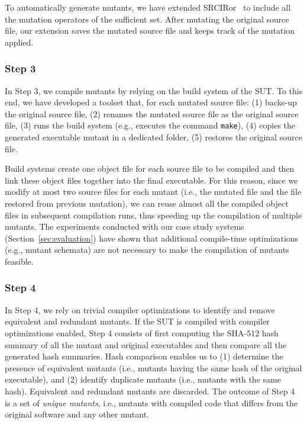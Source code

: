 

To automatically generate mutants, we have extended SRCIRor~\cite{hariri2018srciror} to include all the mutation operators of the sufficient set. After mutating the original source file, our extension saves the mutated source file and keeps track of the mutation applied. 

\subsubsection{Step 3}

In Step 3, we compile mutants by relying on the build system of the SUT. To this end, we have developed a toolset that, for each mutated source file: (1) backs-up the original source file, (2) renames the mutated source file as the original source file, (3) runs the build system (e.g., executes the command \texttt{make}), (4) copies the generated executable mutant in a dedicated folder, (5) restores the original source file. 

Build systems create one object file for each source file to be compiled and then link these object files together into the final executable. For this reason, since we modify at most two source files for each mutant (i.e., the mutated file and the file restored from previous mutation), we can reuse almost all the compiled object files in subsequent compilation runs, thus speeding up the compilation of multiple mutants. The experiments conducted with our case study systems (Section~\ref{sec:evaluation}) have shown that additional compile-time optimizations (e.g., mutant schemata) are not necessary to make the compilation of mutants feasible.

\subsubsection{Step 4}

In Step 4, we rely on trivial compiler optimizations to identify and remove equivalent and redundant mutants. If the SUT is compiled with compiler optimizations enabled, Step 4 consists of first computing the SHA-512 hash summary of all the mutant and original executables and then compare all the generated hash summaries. Hash comparison enables us to (1) determine the presence of equivalent mutants (i.e., mutants having the same hash of the original executable), and (2) identify duplicate mutants (i.e., mutants with the same hash). %
Equivalent and redundant mutants are discarded.
The outcome of Step 4 is a set of \emph{unique mutants}, i.e., mutants with compiled code that differs from the original software and any other mutant.

